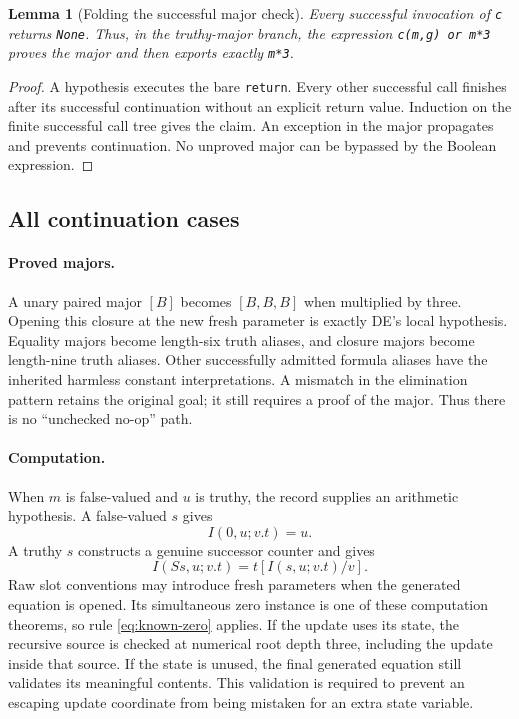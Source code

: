 \documentclass[11pt,letterpaper]{article}
\newtheorem{lemma}[theorem]{Lemma}
\theoremstyle{definition}\newtheorem{definition}[theorem]{Definition}
\theoremstyle{remark}\newtheorem{remark}[theorem]{Remark}
\begin{document}
\begin{lemma}[Folding the successful major check]
Every successful invocation of \texttt{c} returns \texttt{None}.
Thus, in the truthy-major branch, the expression
\texttt{c(m,g) or m*3} proves the major and then exports exactly
\texttt{m*3}.
\end{lemma}
\begin{proof}
A hypothesis executes the bare \texttt{return}. Every other successful
call finishes after its successful continuation without an explicit
return value. Induction on the finite successful call tree gives the
claim. An exception in the major propagates and prevents continuation.
No unproved major can be bypassed by the Boolean expression.
\end{proof}

\subsection{All continuation cases}

\paragraph{Proved majors.}
A unary paired major $[B]$ becomes $[B,B,B]$ when multiplied by three.
Opening this closure at the new fresh parameter is exactly DE's local
hypothesis. Equality majors become length-six truth aliases, and closure
majors become length-nine truth aliases. Other successfully admitted
formula aliases have the inherited harmless constant interpretations.
A mismatch in the elimination pattern retains the original goal; it
still requires a proof of the major. Thus there is no ``unchecked
no-op'' path.

\paragraph{Computation.}
When $m$ is false-valued and $u$ is truthy, the record supplies an
arithmetic hypothesis. A false-valued $s$ gives
\[
   I(0,u;v.t)=u.
\]
A truthy $s$ constructs a genuine successor counter and gives
\[
   I(Ss,u;v.t)=t[I(s,u;v.t)/v].
\]
Raw slot conventions may introduce fresh parameters when the generated
equation is opened. Its simultaneous zero instance is one of these
computation theorems, so rule \eqref{eq:known-zero} applies. If the update
uses its state, the recursive source is checked at numerical root depth
three, including the update inside that source. If the state is unused,
the final generated equation still validates its meaningful contents.
This validation is required to prevent an escaping update coordinate
from being mistaken for an extra state variable.
\end{document}
